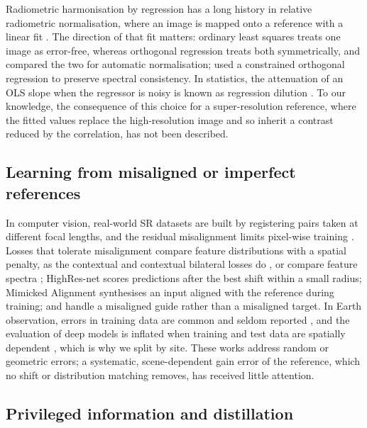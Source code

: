 \documentclass[pdflatex,sn-basic,referee,lineno]{sn-jnl}
\begin{document}
Radiometric harmonisation by regression has a long history in relative radiometric normalisation, where an image is
mapped onto a reference with a linear fit \citep{yuan1996comparison}. The direction of that fit matters: ordinary
least squares treats one image as error-free, whereas orthogonal regression treats both symmetrically, and
\citet{canty2004normalization} compared the two for automatic normalisation; \citet{syariz2019orthogonal} used a
constrained orthogonal regression to preserve spectral consistency. In statistics, the attenuation of an OLS slope
when the regressor is noisy is known as regression dilution \citep{frost2000dilution}. To our knowledge, the
consequence of this choice for a super-resolution reference, where the fitted values replace the high-resolution
image and so inherit a contrast reduced by the correlation, has not been described.

\subsection{Learning from misaligned or imperfect references}

In computer vision, real-world SR datasets are built by registering pairs taken at different focal lengths, and the
residual misalignment limits pixel-wise training \citep{cai2019realsr}. Losses that tolerate misalignment compare
feature distributions with a spatial penalty, as the contextual and contextual bilateral losses do
\citep{mechrez2018contextual,zhang2019zoom}, or compare feature spectra \citep{ni2024fdl}; HighRes-net
\citep{deudon2020highresnet} scores predictions after the best shift within a small radius; Mimicked Alignment
\citep{elezabi2024mimicked} synthesises an input aligned with the reference during training; and
\citet{gupta2022unaligned} handle a misaligned guide rather than a misaligned target. In Earth observation, errors
in training data are common and seldom reported \citep{elmes2020training}, and the evaluation of deep models is
inflated when training and test data are spatially dependent \citep{kattenborn2022autocorrelation,karasiak2022spatial},
which is why we split by site. These works address random or geometric errors; a systematic, scene-dependent gain
error of the reference, which no shift or distribution matching removes, has received little attention.

\subsection{Privileged information and distillation}
\end{document}
